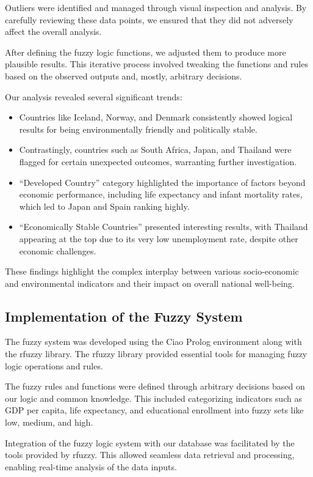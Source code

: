 \documentclass[fleqn,11pt]{article}
\begin{document}
Outliers were identified and managed through visual inspection and analysis. By carefully reviewing these data points, we ensured that they did not adversely affect the overall analysis. 

After defining the fuzzy logic functions, we adjusted them to produce more plausible results. This iterative process involved tweaking the functions and rules based on the observed outputs and, mostly, arbitrary decisions.

Our analysis revealed several significant trends:
\begin{itemize}
    \item Countries like Iceland, Norway, and Denmark consistently showed logical results for being environmentally friendly and politically stable.
    \item Contrastingly, countries such as South Africa, Japan, and Thailand were flagged for certain unexpected outcomes, warranting further investigation.
    \item ``Developed Country'' category highlighted the importance of factors beyond economic performance, including life expectancy and infant mortality rates, which led to Japan and Spain ranking highly.
    \item ``Economically Stable Countries'' presented interesting results, with Thailand appearing at the top due to its very low unemployment rate, despite other economic challenges.
\end{itemize}
These findings highlight the complex interplay between various socio-economic and environmental indicators and their impact on overall national well-being.

\subsection{Implementation of the Fuzzy System}

The fuzzy system was developed using the Ciao Prolog environment along with the rfuzzy library. The rfuzzy library provided essential tools for managing fuzzy logic operations and rules.

The fuzzy rules and functions were defined through arbitrary decisions based on our logic and common knowledge. This included categorizing indicators such as GDP per capita, life expectancy, and educational enrollment into fuzzy sets like low, medium, and high.

Integration of the fuzzy logic system with our database was facilitated by the tools provided by rfuzzy. This allowed seamless data retrieval and processing, enabling real-time analysis of the data inputs.
\end{document}
